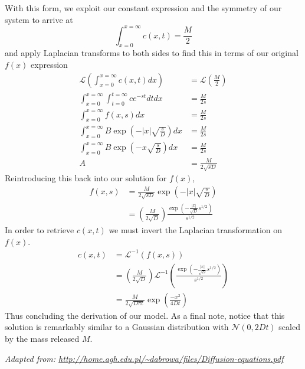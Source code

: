 With this form, we exploit our constant expression and the symmetry of our system to arrive at
$$\int_{x=0}^{x=\infty}c(x,t) = \frac{M}{2}$$
and apply Laplacian transforms to both sides to find this in terms of our original $f(x)$ expression
\begin{align*}
    \mathcal{L}\left(\int_{x=0}^{x=\infty}c(x,t) dx\right) &= \mathcal{L}\left(\frac{M}{2}\right) \\
    \int_{x=0}^{x=\infty} \int_{t=0}^{t=\infty} ce^{-st} dt dx &= \frac{M}{2s} \\
    \int_{x=0}^{x=\infty} f(x,s) dx &= \frac{M}{2s} \\
    \int_{x=0}^{x=\infty} B\exp\left(-|x|\sqrt{\frac{s}{D}}\right) dx &= \frac{M}{2s} \\
    \int_{x=0}^{x=\infty} B\exp\left(-x\sqrt{\frac{s}{D}}\right) dx &= \frac{M}{2s} \\
    A &= \frac{M}{2\sqrt{sD}}
\end{align*}
Reintroducing this back into our solution for $f(x)$,
\begin{align*}
    f(x,s) &= \frac{M}{2\sqrt{sD}}\exp\left(-|x|\sqrt{\frac{s}{D}}\right) \\
    &= \left(\frac{M}{2\sqrt{D}}\right)\frac{\exp\left(-\frac{|x|}{\sqrt{D}}s^{1/2}\right)}{s^{1/2}}
\end{align*}
In order to retrieve $c(x,t)$ we must invert the Laplacian transformation on $f(x)$.
\begin{align*}
    c(x,t) &= \mathcal{L}^{-1}(f(x,s)) \\
    &= \left(\frac{M}{2\sqrt{D}}\right)\mathcal{L}^{-1}
    \left(\frac{\exp\left(-\frac{|x|}{\sqrt{D}}s^{1/2}\right)}{s^{1/2}}\right) \\
    &= \frac{M}{2\sqrt{D\pi t}} \exp\left(\frac{-x^2}{4Dt}\right)
\end{align*}
Thus concluding the derivation of our model. As a final note, notice that this solution is remarkably similar to a Gaussian distribution with $\mathcal{N}(0,2Dt)$ scaled by the mass released $M$.


{\it Adapted from: \url{http://home.agh.edu.pl/~dabrowa/files/Diffusion-equations.pdf}}